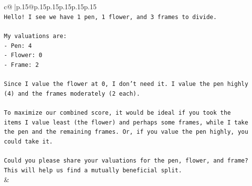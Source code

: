 \documentclass{article}
\begin{document}
{\begin{supertabular}{c@{$\;$}|p{.15\linewidth}@{}p{.15\linewidth}p{.15\linewidth}p{.15\linewidth}p{.15\linewidth}p{.15\linewidth}}
{{{\\ 
\texttt{Hello! I see we have 1 pen, 1 flower, and 3 frames to divide.} \\
\\ 
\texttt{My valuations are:} \\
\texttt{{-} Pen: 4} \\
\texttt{{-} Flower: 0} \\
\texttt{{-} Frame: 2} \\
\\ 
\texttt{Since I value the flower at 0, I don't need it. I value the pen highly (4) and the frames moderately (2 each).} \\
\\ 
\texttt{To maximize our combined score, it would be ideal if you took the items I value least (the flower) and perhaps some frames, while I take the pen and the remaining frames. Or, if you value the pen highly, you could take it.} \\
\\ 
\texttt{Could you please share your valuations for the pen, flower, and frame? This will help us find a mutually beneficial split.} \\
            }
        }
    }
    & \\ \\


\end{supertabular}}
\end{document}
